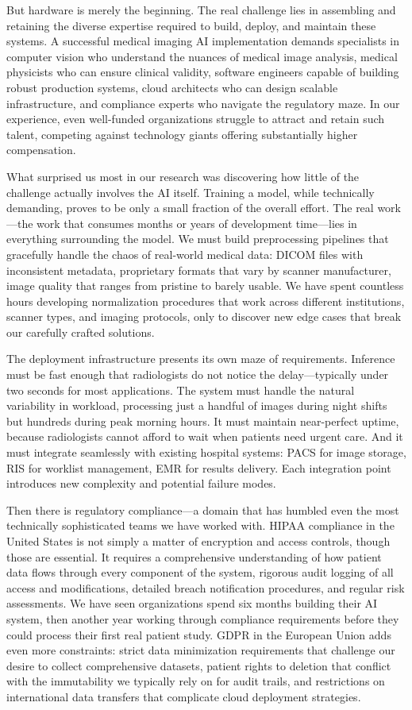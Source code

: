 \documentclass[12pt,a4paper]{article}
\begin{document}
But hardware is merely the beginning. The real challenge lies in assembling and retaining the diverse expertise required to build, deploy, and maintain these systems. A successful medical imaging AI implementation demands specialists in computer vision who understand the nuances of medical image analysis, medical physicists who can ensure clinical validity, software engineers capable of building robust production systems, cloud architects who can design scalable infrastructure, and compliance experts who navigate the regulatory maze. In our experience, even well-funded organizations struggle to attract and retain such talent, competing against technology giants offering substantially higher compensation.

What surprised us most in our research was discovering how little of the challenge actually involves the AI itself. Training a model, while technically demanding, proves to be only a small fraction of the overall effort. The real work—the work that consumes months or years of development time—lies in everything surrounding the model. We must build preprocessing pipelines that gracefully handle the chaos of real-world medical data: DICOM files with inconsistent metadata, proprietary formats that vary by scanner manufacturer, image quality that ranges from pristine to barely usable. We have spent countless hours developing normalization procedures that work across different institutions, scanner types, and imaging protocols, only to discover new edge cases that break our carefully crafted solutions.

The deployment infrastructure presents its own maze of requirements. Inference must be fast enough that radiologists do not notice the delay—typically under two seconds for most applications. The system must handle the natural variability in workload, processing just a handful of images during night shifts but hundreds during peak morning hours. It must maintain near-perfect uptime, because radiologists cannot afford to wait when patients need urgent care. And it must integrate seamlessly with existing hospital systems: PACS for image storage, RIS for worklist management, EMR for results delivery. Each integration point introduces new complexity and potential failure modes.

Then there is regulatory compliance—a domain that has humbled even the most technically sophisticated teams we have worked with. HIPAA compliance in the United States is not simply a matter of encryption and access controls, though those are essential. It requires a comprehensive understanding of how patient data flows through every component of the system, rigorous audit logging of all access and modifications, detailed breach notification procedures, and regular risk assessments. We have seen organizations spend six months building their AI system, then another year working through compliance requirements before they could process their first real patient study. GDPR in the European Union adds even more constraints: strict data minimization requirements that challenge our desire to collect comprehensive datasets, patient rights to deletion that conflict with the immutability we typically rely on for audit trails, and restrictions on international data transfers that complicate cloud deployment strategies.
\end{document}
